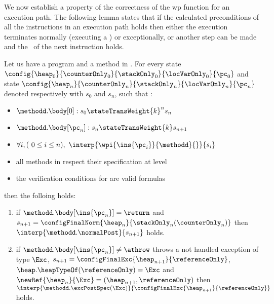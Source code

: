 We now establish a property of the correctness of the wp function  for an execution path. The following lemma states that if the calculated preconditions
of all the instructions in an execution path holds then either the execution terminates normally (executing a \return) or exceptionally, or 
another step can be made and the \fwpi \ of the next instruction holds.



\begin{lemma} \label{lemma1}
Let us have a program \Program{} and a method \methodd{} in \Program. 
For every state  
 $ \config{\heap_{0}}{\counterOnly_{0}}{\stackOnly_{0}}{\locVarOnly_{0}}{\pc_{0}}$ 
and state $\config{\heap_n}{\counterOnly_n}{\stackOnly_n}{\locVarOnly_n}{\pc_n} $ denoted respectively with $s_0$ and  $s_n$,
such that :
 \begin{itemize}
         \item $ \methodd.\body[0] : s_{0} \stateTransWeight{k}^{n} s_n$
         \item $ \methodd.\body[\pc_n] : s_n \stateTransWeight{k} s_{n+1}$
         \item $ \forall i, (\ 0 \leq i \leq n ) , \ \interp{\wpi{\ins{\pc_{i}} }{ \methodd } {  }}{ s_i } $  
	 \item all methods in \Program{} respect their specification at level   
	 \item the verification conditions for \Program{} are valid formulas
 \end{itemize}

then the folloing holds:
\begin{enumerate}
	\item if $\methodd.\body[\ins{\pc_n}] = \return$ and $s_{n+1} =\configFinalNorm{\heap_n}{\stackOnly_n( \counterOnly_n )} $ then $\interp{\methodd.\normalPost} {s_{n+1} } $ holds.  
	
        	\item if $\methodd.\body[\ins{\pc_n}] \neq \athrow  $ throws a not handled exception of type $\Exc$,
	 $ s_{n+1} = \configFinalExc{ \heap_{n+1}}{  \referenceOnly   }$, $\heap.\heapTypeOf(\referenceOnly) = \Exc  $ and  $\newRef{\heap_n}{\Exc} = (\heap_{n+1}, \referenceOnly )$
	 then  $\interp{\methodd.\excPostSpec( \Exc)}{\configFinalExc{ \heap_{n+1}}{  \referenceOnly   } } $ holds.
	

\end{enumerate}
\end{lemma}
